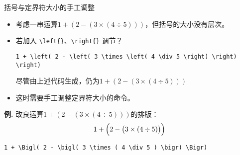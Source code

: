 \documentclass[mathserif]{beamer}
\newcommand{\codegreen}[1]{\textcolor{codegreen}{#1}}
\newenvironment{instance}{\zihao{-5}\textbf{\songti \codegreen{例.}}}{\hfill\par}
\begin{document}
\begin{frame}[fragile]{括号与定界符}{大小的手工调整}
\begin{itemize}

\item 考虑一串运算$1 + \left( 2 - \left( 3 \times \left( 4 \div 5 \right) \right) \right)$，但括号的大小没有层次。

\item 若加入 \lstinline'\left{}'、\lstinline'\right{}' 调节？
\begin{lstlisting}[numbers=none]
1 + \left( 2 - \left( 3 \times \left( 4 \div 5 \right) \right) \right)
\end{lstlisting}
尽管由上述代码生成，仍为$1 + \left( 2 - \left( 3 \times \left( 4 \div 5 \right) \right) \right)$

\item 这时需要手工调整定界符大小的命令。

\end{itemize}
\begin{instance}
	改良运算$1 + \left( 2 - \left( 3 \times \left( 4 \div 5 \right) \right) \right)$的排版：
\begin{equation*}
	1 + \Bigl( 2 - \bigl( 3 \times ( 4 \div 5 ) \bigr) \Bigr)
\end{equation*}
\begin{lstlisting}[numbers=none]
1 + \Bigl( 2 - \bigl( 3 \times ( 4 \div 5 ) \bigr) \Bigr)
\end{lstlisting}
\end{instance}
\end{frame}
\end{document}
